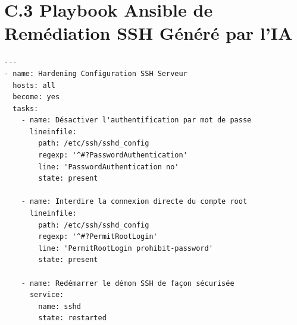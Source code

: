 \section*{C.3 Playbook Ansible de Rem\'ediation SSH G\'en\'er\'e par l'IA}
{\footnotesize
\begin{verbatim}
---
- name: Hardening Configuration SSH Serveur
  hosts: all
  become: yes
  tasks:
    - name: Désactiver l'authentification par mot de passe
      lineinfile:
        path: /etc/ssh/sshd_config
        regexp: '^#?PasswordAuthentication'
        line: 'PasswordAuthentication no'
        state: present

    - name: Interdire la connexion directe du compte root
      lineinfile:
        path: /etc/ssh/sshd_config
        regexp: '^#?PermitRootLogin'
        line: 'PermitRootLogin prohibit-password'
        state: present

    - name: Redémarrer le démon SSH de façon sécurisée
      service:
        name: sshd
        state: restarted
\end{verbatim}
}
